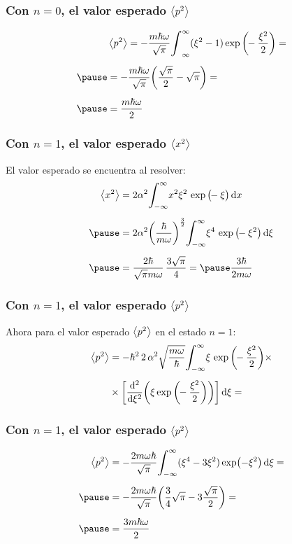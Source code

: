 \documentclass[12pt]{beamer}
\begin{document}
\begin{frame}
\frametitle{Con $n = 0$, el valor esperado $\expval{p^{2}}$}
\pause
\begin{eqnarray*}
\begin{aligned}  
&\expval{p^{2}} = - \dfrac{m \hbar \omega}{\sqrt{\pi}} \scaleint{6ex}_{\infty}^{\infty} (\xi^{2} - 1) \exp\bigg( \!\! - \dfrac{\xi^{2}}{2} \bigg) = \\[0.5em] \pause
&= - \dfrac{m \hbar \omega}{\sqrt{\pi}} \bigg( \dfrac{\sqrt{\pi}}{2} - \sqrt{\pi} \bigg) = \\[0.5em] \pause
&= \dfrac{m \hbar \omega}{2}
\end{aligned}
\end{eqnarray*}
\end{frame}
\begin{frame}
\frametitle{Con $n = 1$, el valor esperado $\expval{x^{2}}$}
El valor esperado se encuentra al resolver:
\begin{eqnarray*}
\begin{aligned}
\expval{x^{2}} &= 2 \alpha^{2} \scaleint{6ex}_{\bs -\infty}^{\infty} x^{2} \xi^{2} \, \exp\big( \!\! - \xi \big) \dd{x} \\[0.5em] \pause
&= 2 \alpha^{2} \bigg( \dfrac{\hbar}{m \omega} \bigg)^{\frac{3}{2}} \scaleint{6ex}_{\bs -\infty}^{\infty} \xi^{4} \, \exp\big( \!\! - \xi^{2} \big) \dd{\xi} \\[0.5em] \pause
&= \dfrac{2 \hbar}{\sqrt{\pi} m \omega} \, \dfrac{3 \sqrt{\pi}}{4} = \pause \dfrac{3 \hbar}{2 m \omega}
\end{aligned}
\end{eqnarray*}
\end{frame}
\begin{frame}
\frametitle{Con $n = 1$, el valor esperado $\expval{p^{2}}$}
Ahora para el valor esperado $\expval{p^{2}}$ en el estado $n = 1$:
\pause
\begin{eqnarray*}
\begin{aligned}
\expval{p^{2}} &= - \hbar^{2} \, 2 \, \alpha^{2} \sqrt{\dfrac{m \omega}{\hbar}} \scaleint{6ex}_{\bs - \infty}^{\infty} \xi \, \exp \bigg(\!\! - \dfrac{\xi^{2}}{2} \bigg) \times \\[0.5em]
&\times \bigg[ \dv[2]{\xi} (\xi \exp\bigg( \!\! - \dfrac{\xi^{2}}{2} \bigg)) \bigg] \dd{\xi} =
\end{aligned}
\end{eqnarray*}
\end{frame}
\begin{frame}
\frametitle{Con $n = 1$, el valor esperado $\expval{p^{2}}$}
\begin{eqnarray*}
\begin{aligned}
\expval{p^{2}} &= - \dfrac{2 m \omega \hbar}{\sqrt{\pi}} \scaleint{6ex}_{\bs - \infty}^{\infty} (\xi^{4} - 3 \xi^{2}) \exp (-\xi^{2}) \dd{\xi} = \\[0.5em] \pause
&= - \dfrac{2 m \omega \hbar}{\sqrt{\pi}} \bigg( \dfrac{3}{4} \sqrt{\pi} - 3 \dfrac{\sqrt{\pi}}{2} \bigg) = \\[0.5em] \pause
&= \dfrac{3 m \hbar \omega}{2}
\end{aligned}
\end{eqnarray*}
\end{frame}
\end{document}
